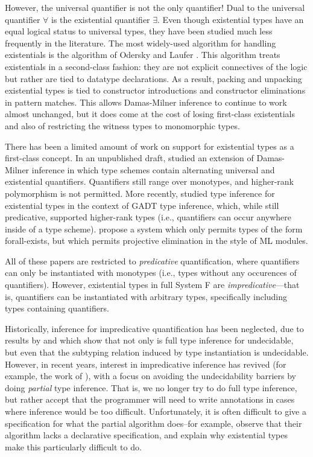 However, the universal quantifier is not the only quantifier! Dual to the
universal quantifier $\forall$ is the existential quantifier $\exists$. Even
though existential types have an equal logical status to universal types, they
have been studied much less frequently in the literature. The most widely-used
algorithm for handling existentials is the algorithm of Odersky and Laufer
\cite{laufer94:polymorphic}. This algorithm treats existentials in a
second-class fashion: they are not explicit connectives of the logic but rather
are tied to datatype declarations. As a result, packing and unpacking
existential types is tied to constructor introductions and constructor
eliminations in pattern matches. This allows Damas-Milner inference to continue
to work almost unchanged, but it does come at the cost of losing first-class
existentials and also of restricting the witness types to monomorphic types.

There has been a limited amount of work on support for existential types as a
first-class concept. In an unpublished draft, \citet{leijen06:first-class}
studied an extension of Damas-Milner inference in which type schemes contain
alternating universal and existential quantifiers. Quantifiers still range over
monotypes, and higher-rank polymorphism is not permitted. More recently,
\citet{dunfield16:existential} studied type inference for existential types in
the context of GADT type inference, which, while still predicative, supported
higher-rank types (i.e., quantifiers can occur anywhere inside of a type
scheme). \citet{eisenberg21:existential} propose a system which only permits
types of the form forall-exists, but which permits projective elimination in the
style of ML modules. 

All of these papers are restricted to \emph{predicative} quantification, where
quantifiers can only be instantiated with monotypes (i.e., types without any
occurences of quantifiers). However, existential types in full System F are
\emph{impredicative}---that is, quantifiers can be instantiated with arbitrary
types, specifically including types containing quantifiers.

Historically, inference for impredicative quantification has been neglected, due
to results by \citet{tiuryn-urzczyn-96} and \citet{chrzaszcz-98} which show that
not only is full type inference for \systemf undecidable, but even that the
subtyping relation induced by type instantiation is undecidable. However, in
recent years, interest in impredicative inference has revived (for example, the
work of \citet{serrano-2020}), with a focus on avoiding the undecidability
barriers by doing \emph{partial} type inference. That is, we no longer try to do
full type inference, but rather accept that the programmer will need to write
annotations in cases where inference would be too difficult. Unfortunately, it
is often difficult to give a specification for what the partial algorithm
does--for example, \citet{eisenberg21:existential} observe that their algorithm
lacks a declarative specification, and explain why existential types make this
particularly difficult to do. 

